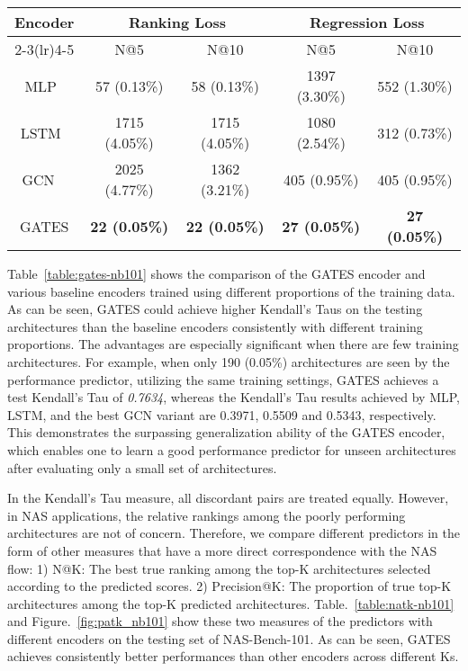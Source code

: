 \documentclass[runningheads]{llncs}
\begin{document}
\begin{table*}[th]
    \caption{N@K on NAS-Bench-101. All predictors are trained with 0.1\% of the training data (i.e., 381 architectures)}
    \label{table:natk-nb101}
    \begin{center}
    \begin{tabular}{c@{\hskip 0.02\linewidth}cccc}
    \toprule
    \multirow{2}{*}{Encoder} & \multicolumn{2}{c}{Ranking Loss} &  \multicolumn{2}{c}{Regression Loss} \\ 
    \cmidrule(lr){2-3}\cmidrule(lr){4-5} & N@5 & N@10 & N@5 & N@10  \\ \midrule
    MLP~\cite{wang2018alphax}   &    57 (0.13\%)    &    58 (0.13\%)   &    1397 (3.30\%)   &   552 (1.30\%)    \\
    LSTM~\cite{wang2018alphax}     &      1715 (4.05\%)  &   1715 (4.05\%) &   1080 (2.54\%)   & 312 (0.73\%)  \\
    GCN ~\cite{shi2019multi} & 2025 (4.77\%) & 1362 (3.21\%) & 405 (0.95\%) & 405 (0.95\%) \\
    \hline
    GATES & {\bf 22 (0.05\%)} & {\bf 22 (0.05\%)} & {\bf 27 (0.05\%)} & {\bf 27 (0.05\%)} \\\bottomrule
    \end{tabular}
\end{center}
\end{table*}




Table~\ref{table:gates-nb101} shows the comparison of the GATES encoder and various baseline encoders trained using different proportions of the training data. 
As can be seen, GATES could achieve higher Kendall's Taus on the testing architectures than the baseline encoders consistently with different training proportions. The advantages are especially significant when there are few training architectures. For example, when only 190 (0.05\%) architectures are seen by the performance predictor, utilizing the same training settings, GATES achieves a test Kendall's Tau of \textit{0.7634},
whereas the Kendall's Tau results achieved by MLP, LSTM, and the best GCN variant are 0.3971, 0.5509 and 0.5343, respectively. This demonstrates the surpassing generalization ability of the GATES encoder, which enables one to learn a good performance predictor for unseen architectures after evaluating only a small set of architectures.


In the Kendall's Tau measure, all discordant pairs are treated equally. However, in NAS applications, the relative rankings among the poorly performing architectures are not of concern. Therefore, we compare different predictors in the form of other measures that have a more direct correspondence with the NAS flow: 1) N@K: The best true ranking among the top-K architectures selected according to the predicted scores. 2) Precision@K: The proportion of true top-K architectures among the top-K predicted architectures. Table.~\ref{table:natk-nb101} and Figure.~\ref{fig:patk_nb101} show these two measures of the predictors with different encoders on the testing set of NAS-Bench-101. As can be seen, GATES achieves consistently better performances than other encoders across different Ks.
\end{document}
